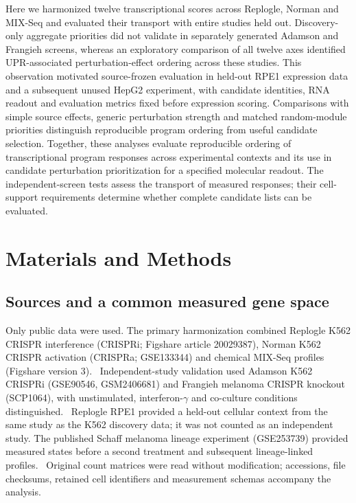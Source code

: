 \documentclass[a4paper,fleqn]{cas-sc}
\makeatletter
\DeclareRobustCommand{\rev}[1]{{\color{red}\def\@citecolor{black}\def\@linkcolor{red}\def\@urlcolor{red}#1}}
\let\unmarkedcite\cite
\renewcommand{\cite}[1]{{\color{black}\def\@citecolor{black}\unmarkedcite{#1}}}
\makeatother
\begin{document}
\rev{Here we harmonized twelve transcriptional scores across Replogle, Norman and MIX-Seq and evaluated their transport with entire studies held out.} \rev{Discovery-only aggregate priorities did not validate in separately generated Adamson and Frangieh screens, whereas an exploratory comparison of all twelve axes identified UPR-associated perturbation-effect ordering across these studies.} \rev{This observation motivated source-frozen evaluation in held-out RPE1 expression data and a subsequent unused HepG2 experiment, with candidate identities, RNA readout and evaluation metrics fixed before expression scoring.} \rev{Comparisons with simple source effects, generic perturbation strength and matched random-module priorities distinguish reproducible program ordering from useful candidate selection.} \rev{Together, these analyses evaluate reproducible ordering of transcriptional program responses across experimental contexts and its use in candidate perturbation prioritization for a specified molecular readout.} \rev{The independent-screen tests assess the transport of measured responses; their cell-support requirements determine whether complete candidate lists can be evaluated.}

\section{Materials and Methods}

\subsection{\rev{Sources and a common measured gene space}}

\rev{Only public data were used.} \rev{The primary harmonization combined Replogle K562 CRISPR interference (CRISPRi; Figshare article 20029387), Norman K562 CRISPR activation (CRISPRa; GSE133344) and chemical MIX-Seq profiles (Figshare version 3).~\cite{replogle2022,norman2019,mcfarland2020}} \rev{Independent-study validation used Adamson K562 CRISPRi (GSE90546, GSM2406681) and Frangieh melanoma CRISPR knockout (SCP1064), with unstimulated, interferon-$\gamma$ and co-culture conditions distinguished.~\cite{adamson2016,frangieh2021}} \rev{Replogle RPE1 provided a held-out cellular context from the same study as the K562 discovery data; it was not counted as an independent study.} \rev{The published Schaff melanoma lineage experiment (GSE253739) provided measured states before a second treatment and subsequent lineage-linked profiles.~\cite{schaff2024}} \rev{Original count matrices were read without modification; accessions, file checksums, retained cell identifiers and measurement schemas accompany the analysis.}
\end{document}
